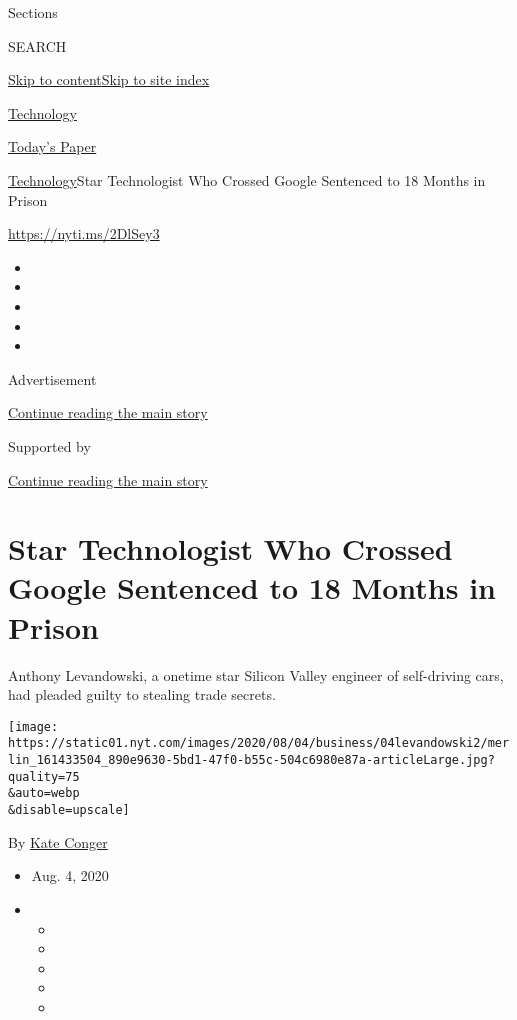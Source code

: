 Sections

SEARCH

\protect\hyperlink{site-content}{Skip to
content}\protect\hyperlink{site-index}{Skip to site index}

\href{https://www.nytimes.com/section/technology}{Technology}

\href{https://myaccount.nytimes.com/auth/login?response_type=cookie\&client_id=vi}{}

\href{https://www.nytimes.com/section/todayspaper}{Today's Paper}

\href{/section/technology}{Technology}\textbar{}Star Technologist Who
Crossed Google Sentenced to 18 Months in Prison

\url{https://nyti.ms/2DlSey3}

\begin{itemize}
\item
\item
\item
\item
\item
\end{itemize}

Advertisement

\protect\hyperlink{after-top}{Continue reading the main story}

Supported by

\protect\hyperlink{after-sponsor}{Continue reading the main story}

\hypertarget{star-technologist-who-crossed-google-sentenced-to-18-months-in-prison}{%
\section{Star Technologist Who Crossed Google Sentenced to 18 Months in
Prison}\label{star-technologist-who-crossed-google-sentenced-to-18-months-in-prison}}

Anthony Levandowski, a onetime star Silicon Valley engineer of
self-driving cars, had pleaded guilty to stealing trade secrets.

\texttt{[image: https://static01.nyt.com/images/2020/08/04/business/04levandowski2/merlin\_161433504\_890e9630-5bd1-47f0-b55c-504c6980e87a-articleLarge.jpg?quality=75\\\&auto=webp\\\&disable=upscale]}

By \href{https://www.nytimes.com/by/kate-conger}{Kate Conger}

\begin{itemize}
\item
  Aug. 4, 2020
\item
  \begin{itemize}
  \item
  \item
  \item
  \item
  \item
  \end{itemize}
\end{itemize}

